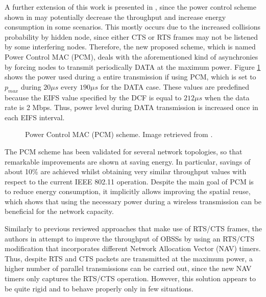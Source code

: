 \documentclass[12pt, a4paper,twoside]{tesi_upf}
\begin{document}
				A further extension of this work is presented in \cite{jung2002power}, since the power control scheme shown in \cite{pursley2000energy} may potentially decrease the throughput and increase energy consumption in some scenarios. This mostly occurs due to the increased collisions probability by hidden node, since either CTS or RTS frames may not be listened by some interfering nodes. Therefore, the new proposed scheme, which is named Power Control MAC (PCM), deals with the aforementioned kind of asynchronies by forcing nodes to transmit periodically DATA at the maximum power. Figure \ref{fig:pcm} shows the power used during a entire transmission if using PCM, which is set to $p_{max}$ during $20 \mu s$ every $190 \mu s$ for the DATA case. These values are predefined because the EIFS value specified by the DCF is equal to $212 \mu s$ when the data rate is 2 Mbps. Thus, power level during DATA transmission is increased once in each EIFS interval.
				\begin{figure}[h!]
					\centering
					\caption{Power Control MAC (PCM) scheme. Image retrieved from \cite{pursley2000energy}.}
					\label{fig:pcm}
				\end{figure}
			
				The PCM scheme has been validated for several network topologies, so that remarkable improvements are shown at saving energy. In particular, savings of about 10\% are achieved whilst obtaining very similar throughput values with respect to the current IEEE 802.11 operation. Despite the main goal of PCM is to reduce energy consumption, it implicitly allows improving the spatial reuse, which shows that using the necessary power during a wireless transmission can be beneficial for the network capacity.
				
				Similarly to previous reviewed approaches that make use of RTS/CTS frames, the authors in \cite{lei2015performance} attempt to improve the throughput of OBSSs by using an RTS/CTS modification that incorporates different Network Allocation Vector (NAV) timers. Thus, despite RTS and CTS packets are transmitted at the maximum power, a higher number of parallel transmissions can be carried out, since the new NAV timers only captures the RTS/CTS operation. However, this solution appears to be quite rigid and to behave properly only in few situations.
				
\end{document}
